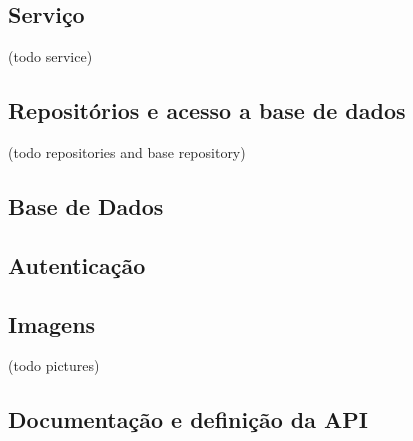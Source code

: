\newpage

\subsection{Serviço}
(todo service)

\subsection{Repositórios e acesso a base de dados}
(todo repositories and base repository)

\subsection{Base de Dados}

\subsection{Autenticação}

\subsection{Imagens}
(todo pictures)

\subsection{Documentação e definição da API}
